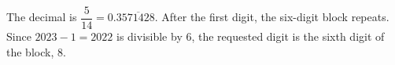 The decimal is $\dfrac{5}{14}=0.3\overline{571428}$. After the first digit, the six-digit block repeats. Since $2023-1=2022$ is divisible by 6, the requested digit is the sixth digit of the block, $\boxed8$.
